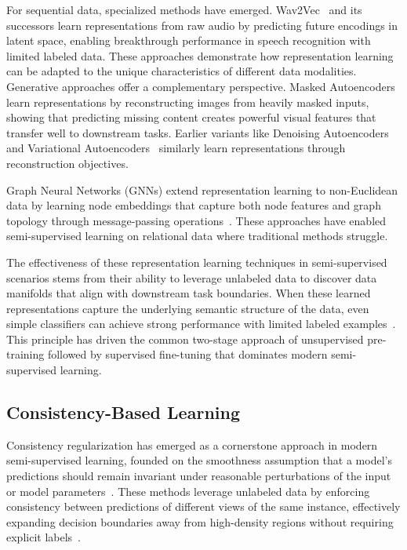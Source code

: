 For sequential data, specialized methods have emerged. Wav2Vec~\cite{baevski2020wav2vec} and its successors learn representations from raw audio by predicting future encodings in latent space, enabling breakthrough performance in speech recognition with limited labeled data. These approaches demonstrate how representation learning can be adapted to the unique characteristics of different data modalities. Generative approaches offer a complementary perspective. Masked Autoencoders~\cite{he2022masked} learn representations by reconstructing images from heavily masked inputs, showing that predicting missing content creates powerful visual features that transfer well to downstream tasks. Earlier variants like Denoising Autoencoders~\cite{vincent2008extracting} and Variational Autoencoders~\cite{kingma2013auto} similarly learn representations through reconstruction objectives.

Graph Neural Networks (GNNs) extend representation learning to non-Euclidean data by learning node embeddings that capture both node features and graph topology through message-passing operations~\cite{kipf2016semi, hamilton2017inductive}. These approaches have enabled semi-supervised learning on relational data where traditional methods struggle.

The effectiveness of these representation learning techniques in semi-supervised scenarios stems from their ability to leverage unlabeled data to discover data manifolds that align with downstream task boundaries. When these learned representations capture the underlying semantic structure of the data, even simple classifiers can achieve strong performance with limited labeled examples~\cite{oliver2018realistic}. This principle has driven the common two-stage approach of unsupervised pre-training followed by supervised fine-tuning that dominates modern semi-supervised learning.

\subsection{Consistency-Based Learning}

Consistency regularization has emerged as a cornerstone approach in modern semi-supervised learning, founded on the smoothness assumption that a model's predictions should remain invariant under reasonable perturbations of the input or model parameters~\cite{oliver2018realistic,sohn2020fixmatch}. These methods leverage unlabeled data by enforcing consistency between predictions of different views of the same instance, effectively expanding decision boundaries away from high-density regions without requiring explicit labels~\cite{chapelle2009semi}.

